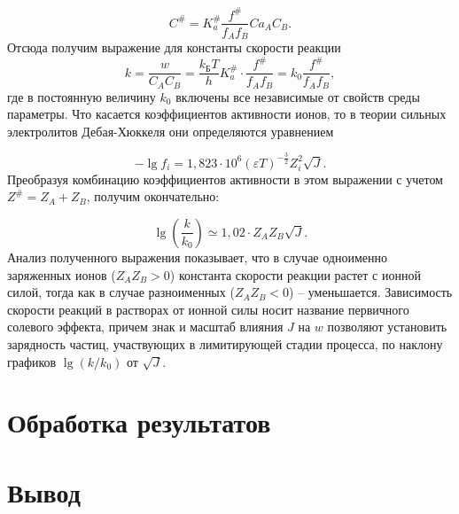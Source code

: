 \documentclass[a4paper, 12pt]{article}
\begin{document}
\[C^\#=K_a^\#\frac{f^\#}{f_Af_B}Ca_AC_B.\]
Отсюда получим выражение для константы скорости реакции
\[k=\frac{w}{C_AC_B}=\frac{k_\text{Б}T}{h}K_a^\#\cdot\frac{f^\#}{f_Af_B}=k_0\frac{f^\#}{f_Af_B},\]
где в постоянную величину $k_0$ включены все независимые от свойств среды параметры.
Что касается коэффициентов активности ионов, то в теории сильных электролитов
Дебая-Хюккеля они определяются уравнением

\[-\lg{f_i}=1,823\cdot10^6(\varepsilon T)^{-\frac{3}{2}}Z_i^2\sqrt{J}.\]
Преобразуя комбинацию коэффициентов активности в этом выражении с учетом $Z^\#=Z_A+Z_B$, получим окончательно:

\[\lg{\left(\frac{k}{k_0}\right)}\simeq 1,02\cdot Z_AZ_B\sqrt{J}.\]
Анализ полученного выражения показывает, что в случае одноименно
заряженных ионов ($Z_AZ_B > 0$) константа скорости реакции растет с ионной силой, тогда
как в случае разноименных ($Z_AZ_B < 0$) – уменьшается. Зависимость скорости реакций в
растворах от ионной силы носит название первичного солевого эффекта, причем знак и
масштаб влияния $J$ на $w$ позволяют установить зарядность частиц, участвующих в
лимитирующей стадии процесса, по наклону графиков $\lg{\left(k/k_0\right)}$ от $\sqrt{J}$.

\newpage
\section{Обработка результатов}


\begin{figure}[h]
	\centering
	\caption{}
\end{figure}
\newpage

\begin{figure}[t]
	\centering
	\caption{}
\end{figure}

\begin{figure}[h!]
	\centering
	\caption{}
\end{figure}

\newpage
\section{Вывод}
\end{document}

